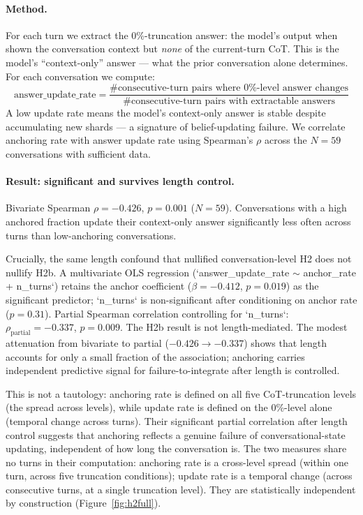 \documentclass{article}
\begin{document}
\paragraph{Method.}
For each turn we extract the 0\%-truncation answer: the model's output
when shown the conversation context but \emph{none} of the current-turn
CoT.
This is the model's ``context-only'' answer --- what the prior
conversation alone determines.
For each conversation we compute:
\[
  \text{answer\_update\_rate}
  = \frac{\text{\# consecutive-turn pairs where 0\%-level answer changes}}
         {\text{\# consecutive-turn pairs with extractable answers}}
\]
A low update rate means the model's context-only answer is stable
despite accumulating new shards --- a signature of belief-updating failure.
We correlate anchoring rate with answer update rate using Spearman's
$\rho$ across the $N=59$ conversations with sufficient data.

\paragraph{Result: significant and survives length control.}
Bivariate Spearman $\rho = -0.426$, $p = 0.001$ ($N=59$).
Conversations with a high anchored fraction update their context-only
answer significantly less often across turns than low-anchoring
conversations.

Crucially, the same length confound that nullified conversation-level H2
does not nullify H2b.
A multivariate OLS regression (`answer\_update\_rate $\sim$ anchor\_rate + n\_turns`)
retains the anchor coefficient ($\beta = -0.412$, $p = 0.019$) as
the significant predictor; `n\_turns` is non-significant after conditioning
on anchor rate ($p = 0.31$).
Partial Spearman correlation controlling for `n\_turns`:
$\rho_{\text{partial}} = -0.337$, $p = 0.009$.
The H2b result is not length-mediated.
The modest attenuation from bivariate to partial ($-0.426 \to -0.337$)
shows that length accounts for only a small fraction of the association;
anchoring carries independent predictive signal for failure-to-integrate
after length is controlled.

This is not a tautology: anchoring rate is defined on all five
CoT-truncation levels (the spread across levels), while update rate is
defined on the 0\%-level alone (temporal change across turns).
Their significant partial correlation after length control suggests
that anchoring reflects a genuine failure of conversational-state
updating, independent of how long the conversation is.
The two measures share no turns in their computation: anchoring
rate is a cross-level spread (within one turn, across five
truncation conditions); update rate is a temporal change
(across consecutive turns, at a single truncation level).
They are statistically independent by construction (Figure~\ref{fig:h2full}).
\end{document}
